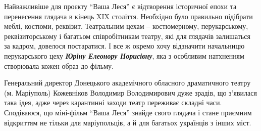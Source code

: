 Найважливіше для проєкту \enquote{Ваша Леся} є відтворення історичної епохи та
перенесення глядача в кінець XIX століття. Необхідно було правильно підібрати
меблі, костюми, реквізит. Театральним цехам – костюмерному, перукарському,
реквізиторському і багатьом співробітникам театру, які для глядачів залишаться
за кадром, довелося постаратися. І все ж окремо хочу відзначити начальницю
перукарського цеху \emph{\textbf{Юріну Елеонору Норисівну}}, яка з особливим натхненням
створювала кожен образ до фільму.


Генеральний директор Донецького академічного обласного драматичного театру (м.
Маріуполь) Кожевніков Володимир Володимирович  дуже зрадів, що з'явилася така
ідея, адже через карантинні заходи театр переживає складні часи. Сподіваюся, що
міні-фільм \enquote{Ваша Леся} знайде свого глядача і стане приємним відкриттям не
тільки для маріупольців, а й для багатьох українців з інших міст.

